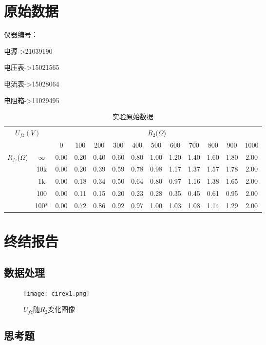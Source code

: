 \documentclass[12pt,a4paper,oneside,left=3.18,right=3.18,top=2.54,bottom=2.54]{ctexart}
\begin{document}
\section{原始数据}
	\noindent
	仪器编号：\par
	电源->21039190\par
	电压表->15021565\par
	电流表->15028064\par
	电阻箱->11029495\\
	\begin{table}[H]
		\centering
		\begin{tabular}{|c|c|c|c|c|c|c|c|c|c|c|c|c|}
		\hline
		\multicolumn{2}{|c|}{\multirow{2}{*}{$U_{fz}(V)$}} & \multicolumn{11}{c|}{$R_2$($\Omega$)$$}\\
		\cline{3-13}
		\multicolumn{2}{|c|}{}&0&100&200&300&400&500&600&700&800&900&1000\\
		\hline
		\multirow{5}{*}{$R_{fz}$($\Omega$)$$}&$\infty$&0.00&0.20&0.40&0.60&0.80&1.00&1.20&1.40&1.60&1.80&2.00\\
		\cline{2-13}
		\multirow{5}{*}{}&10k&0.00&0.20&0.39&0.59&0.78&0.98&1.17&1.37&1.57&1.78&2.00\\
		\cline{2-13}
		\multirow{5}{*}{}&1k&0.00&0.18&0.34&0.50&0.64&0.80&0.97&1.16&1.38&1.65&2.00\\
		\cline{2-13}
		\multirow{5}{*}{}&100&0.00&0.11&0.15&0.20&0.23&0.28&0.35&0.45&0.61&0.95&2.00\\
		\cline{2-13}
		\multirow{5}{*}{}&100*&0.00&0.72&0.86&0.92&0.97&1.00&1.03&1.08&1.14&1.29&2.00\\
		\hline
		\end{tabular}
		\caption{实验原始数据}
		\label{table1}
	\end{table}
	\par
\section{终结报告}
	\subsection{数据处理}
		\begin{figure}[H]
		\centering
		\texttt{[image: cirex1.png]}
		\caption{$U_{fz}$随$R_2$变化图像}
		\label{figure3}
		\end{figure}
	\subsection{思考题}
\end{document}
